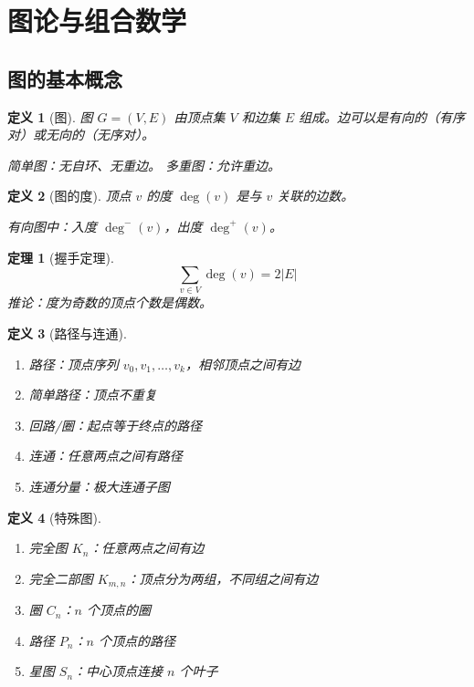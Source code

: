 \documentclass[12pt]{article}
\newtheorem{theorem}{定理}[section]
\newtheorem{definition}{定义}[section]
\begin{document}
\section{图论与组合数学}

\subsection{图的基本概念}

\begin{definition}[图]
图 $G = (V, E)$ 由顶点集 $V$ 和边集 $E$ 组成。边可以是有向的（有序对）或无向的（无序对）。

简单图：无自环、无重边。
多重图：允许重边。
\end{definition}

\begin{definition}[图的度]
顶点 $v$ 的度 $\deg(v)$ 是与 $v$ 关联的边数。

有向图中：入度 $\deg^-(v)$，出度 $\deg^+(v)$。
\end{definition}

\begin{theorem}[握手定理]
$$\sum_{v \in V} \deg(v) = 2|E|$$
推论：度为奇数的顶点个数是偶数。
\end{theorem}

\begin{definition}[路径与连通]
\begin{enumerate}
\item 路径：顶点序列 $v_0, v_1, \ldots, v_k$，相邻顶点之间有边
\item 简单路径：顶点不重复
\item 回路/圈：起点等于终点的路径
\item 连通：任意两点之间有路径
\item 连通分量：极大连通子图
\end{enumerate}
\end{definition}

\begin{definition}[特殊图]
\begin{enumerate}
\item 完全图 $K_n$：任意两点之间有边
\item 完全二部图 $K_{m,n}$：顶点分为两组，不同组之间有边
\item 圈 $C_n$：$n$ 个顶点的圈
\item 路径 $P_n$：$n$ 个顶点的路径
\item 星图 $S_n$：中心顶点连接 $n$ 个叶子
\end{enumerate}
\end{definition}
\end{document}
